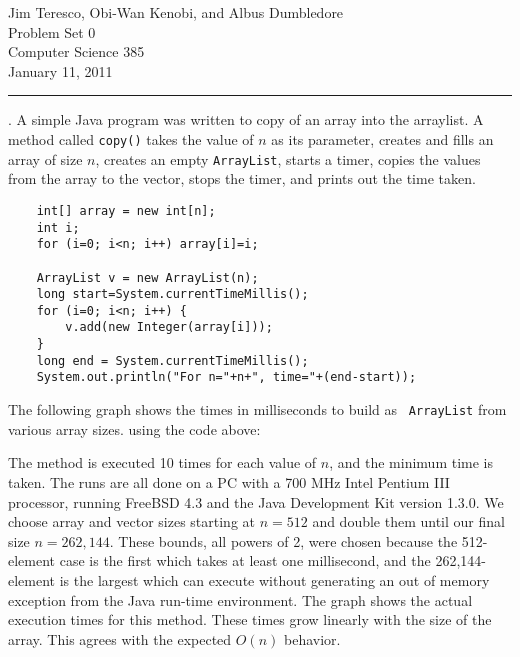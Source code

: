 \documentclass[12pt]{article}
\begin{document}


\thispagestyle{empty}


Jim Teresco, Obi-Wan Kenobi, and Albus Dumbledore\\
Problem Set 0\\
Computer Science 385\\
January 11, 2011

\bigskip
\hrule
\bigskip

.  A simple Java program was written to copy of an array into the
arraylist.  A method called {\tt copy()} takes the value of $n$ as its
parameter, creates and fills an array of size $n$, creates an empty
{\tt ArrayList}, starts a timer, copies the values from the array to
the vector, stops the timer, and prints out the time taken.

\begin{verbatim}
    int[] array = new int[n];
    int i;
    for (i=0; i<n; i++) array[i]=i;
	
    ArrayList v = new ArrayList(n);
    long start=System.currentTimeMillis();
    for (i=0; i<n; i++) {
        v.add(new Integer(array[i]));
    }
    long end = System.currentTimeMillis();
    System.out.println("For n="+n+", time="+(end-start));
\end{verbatim}

The following graph shows the times in milliseconds to build as {\tt
  ArrayList} from various array sizes. using the code above:

\begin{center}
\end{center}

The method is executed 10 times for each value of $n$, and the minimum
time is taken.  The runs are all done on a PC with a 700 MHz Intel
Pentium III processor, running FreeBSD 4.3 and the Java Development
Kit version 1.3.0.  We choose array and vector sizes starting at
$n=512$ and double them until our final size $n=262,144$.  These
bounds, all powers of 2, were chosen because the 512-element case is
the first which takes at least one millisecond, and the
262,144-element is the largest which can execute without generating an
out of memory exception from the Java run-time environment.  The graph
shows the actual execution times for this method.  These times grow
linearly with the size of the array.  This agrees with the expected
$O(n)$ behavior.
\end{document}
